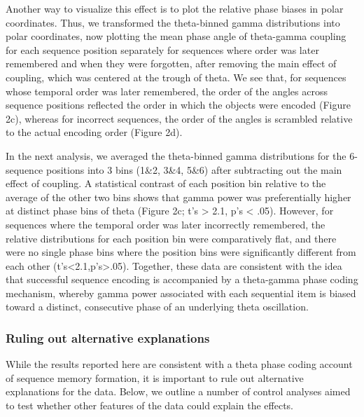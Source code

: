 Another way to visualize this effect is to plot the relative phase
biases in polar coordinates. Thus, we transformed the theta-binned gamma
distributions into polar coordinates, now plotting the mean phase angle
of theta-gamma coupling for each sequence position separately for
sequences where order was later remembered and when they were forgotten,
after removing the main effect of coupling, which was centered at the
trough of theta. We see that, for sequences whose temporal order was
later remembered, the order of the angles across sequence positions
reflected the order in which the objects were encoded (Figure 2c),
whereas for incorrect sequences, the order of the angles is scrambled
relative to the actual encoding order (Figure 2d).

In the next analysis, we averaged the theta-binned gamma distributions
for the 6-sequence positions into 3 bins (1\&2, 3\&4, 5\&6) after
subtracting out the main effect of coupling. A statistical contrast of
each position bin relative to the average of the other two bins shows
that gamma power was preferentially higher at distinct phase bins of
theta (Figure 2c; t's \textgreater{} 2.1, p's \textless{} .05). However,
for sequences where the temporal order was later incorrectly remembered,
the relative distributions for each position bin were comparatively
flat, and there were no single phase bins where the position bins were
significantly different from each other
(t's\textless{}2.1,p's\textgreater{}.05). Together, these data are
consistent with the idea that successful sequence encoding is
accompanied by a theta-gamma phase coding mechanism, whereby gamma power
associated with each sequential item is biased toward a distinct,
consecutive phase of an underlying theta oscillation.

\subsubsection{Ruling out alternative
explanations}\label{ruling-out-alternative-explanations}

While the results reported here are consistent with a theta phase coding
account of sequence memory formation, it is important to rule out
alternative explanations for the data. Below, we outline a number of
control analyses aimed to test whether other features of the data could
explain the effects.


